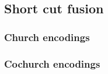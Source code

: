 \subsection{Short cut fusion}
\subsubsection{Church encodings}





\subsubsection{Cochurch encodings}


